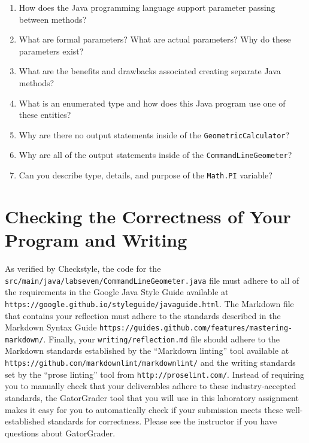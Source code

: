 \documentclass[11pt]{article}
\newcommand{\mainprogram}{\lstinline{CommandLineGeometer}}
\newcommand{\mainprogramsource}{\lstinline{src/main/java/labseven/CommandLineGeometer.java}}
\newcommand{\secondprogram}{\lstinline{GeometricCalculator}}
\newcommand{\reflection}{\lstinline{writing/reflection.md}}
\newcommand{\program}[1]{\lstinline{#1}}
\newcommand{\url}[1]{\lstinline{#1}}
\newcommand{\step}[1]{``{#1}''}
\begin{document}
\begin{enumerate}

  \item How does the Java programming language support parameter passing
    between methods?

  \item What are formal parameters? What are actual parameters? Why do these
    parameters \mbox{exist}?

  \item What are the benefits and drawbacks associated creating separate
    Java methods?

  \item What is an enumerated type and how does this Java program use one of
    these entities?

  \item Why are there no output statements inside of the \secondprogram?

  \item Why are all of the output statements inside of the \mainprogram?

  \item Can you describe type, details, and purpose of the \program{Math.PI}
    variable?

\end{enumerate}

\section*{Checking the Correctness of Your Program and Writing}

As verified by Checkstyle, the code for the \mainprogramsource{} file must
adhere to all of the requirements in the Google Java Style Guide available at
\url{https://google.github.io/styleguide/javaguide.html}. The Markdown file that
contains your reflection must adhere to the standards described in the Markdown
Syntax Guide \url{https://guides.github.com/features/mastering-markdown/}.
Finally, your \reflection{} file should adhere to the Markdown standards
established by the \step{Markdown linting} tool available at
\url{https://github.com/markdownlint/markdownlint/} and the writing standards
set by the \step{prose linting} tool from \url{http://proselint.com/}. Instead
of requiring you to manually check that your deliverables adhere to these
industry-accepted standards, the GatorGrader tool that you will use in this
laboratory assignment makes it easy for you to automatically check if your
submission meets these well-established standards for correctness. Please see
the instructor if you have questions about GatorGrader.
\end{document}
